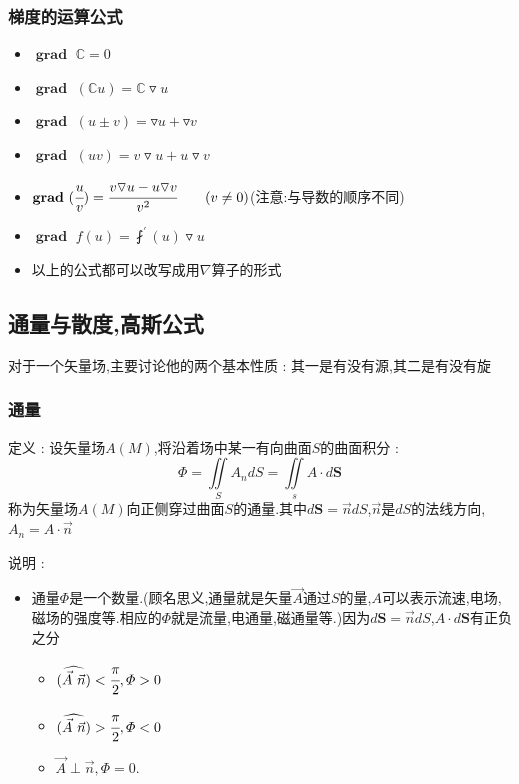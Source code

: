 \documentclass[UTF8,12pt]{ctexbook}
\newcommand{\derivative}{^\prime}
\newcommand{\fDerivative}[1]{\fint\derivative(#1)}
\newcommand{\defFunction}[1]{f(#1)}
\newcommand{\mathConstant}{\mathbb{C}}
\newcommand{\doubleIntegralOnZone}[1]{\iint\limits_{#1}}
\newcommand{\vecAngle}[2]{(\widehat{#1\ #2})}
\DeclareMathOperator{\gradText}{\mathbf{grad}\ }
\begin{document}
{{{{    \subsubsection{梯度的运算公式}{
      \begin{itemize}
        \item $\gradText \mathConstant = 0$
        \item $\gradText (\mathConstant u) = \mathConstant \triangledown u$
        \item $\gradText (u \pm v) = \triangledown u + \triangledown v$
        \item $\gradText (uv) = v\triangledown u + u\triangledown v$
        \item $\gradText (\cfrac{u}{v}) = \cfrac{v\triangledown u - u\triangledown v}{v^2}\qquad (v \neq 0)$(注意:与导数的顺序不同)
        \item $\gradText \defFunction{u} = \fDerivative{u}\triangledown u$
        \item 以上的公式都可以改写成用$\nabla$算子的形式
      \end{itemize}
    }%

  }%

  \subsection{通量与散度,高斯公式}{
    对于一个矢量场,主要讨论他的两个基本性质 : 其一是有没有源,其二是有没有旋

    \subsubsection{通量}{
      定义 : 设矢量场$A(M)$,将沿着场中某一有向曲面$S$的曲面积分 :
      $$
        \varPhi = \doubleIntegralOnZone{S} A_n dS = \doubleIntegralOnZone{s} A \cdot d\mathbf{S}
      $$
      称为矢量场$A(M)$向正侧穿过曲面$S$的通量.其中$d\mathbf{S} = \vec{n}dS$,$\vec{n}$是$dS$的法线方向,$A_n = A \cdot \vec{n}$

      说明 :
      \begin{itemize}
        \item {通量$\varPhi$是一个数量.(顾名思义,通量就是矢量$\vec{A}$通过$S$的量,$A$可以表示流速,电场,磁场的强度等.相应的$\varPhi$就是流量,电通量,磁通量等.)因为$d\mathbf{S} = \vec{n}dS$,$A\cdot d\mathbf{S}$有正负之分

              \begin{itemize}
                \item $\vecAngle{\vec{A}}{\vec{n}} < \cfrac{\pi}{2},\varPhi > 0$
                \item $\vecAngle{\vec{A}}{\vec{n}} > \cfrac{\pi}{2},\varPhi < 0$
                \item $\vec{A} \perp \vec{n},\varPhi = 0$.
              \end{itemize}

}
\end{itemize}}}}}}
\end{document}

